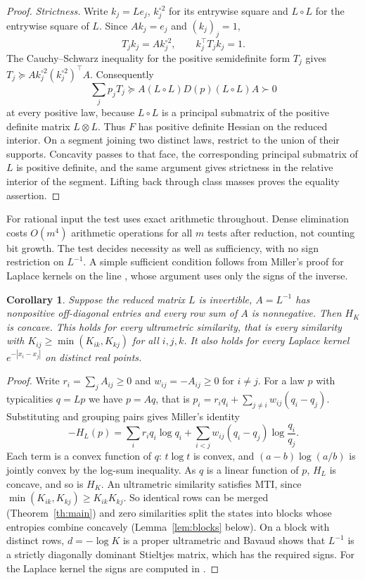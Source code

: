 \documentclass[11pt,a4paper]{article}
\newtheorem{corollary}[theorem]{Corollary}
\theoremstyle{remark}
\begin{document}
\begin{proof}
\emph{Strictness.} Write $k_j=Le_j$, $k_j^{\circ 2}$ for its entrywise square and $L\circ L$ for the entrywise square of $L$. Since $Ak_j=e_j$ and $(k_j)_j=1$,
\[
 T_j k_j=A k_j^{\circ 2},\qquad k_j^\top T_j k_j=1.
\]
The Cauchy--Schwarz inequality for the positive semidefinite form $T_j$ gives $T_j\succeq A k_j^{\circ 2}(k_j^{\circ 2})^\top A$. Consequently
\[
 \sum_j p_jT_j\succeq A(L\circ L)D(p)(L\circ L)A\succ0
\]
at every positive law, because $L\circ L$ is a principal submatrix of the positive definite matrix $L\otimes L$. Thus $F$ has positive definite Hessian on the reduced interior. On a segment joining two distinct laws, restrict to the union of their supports. Concavity passes to that face, the corresponding principal submatrix of $L$ is positive definite, and the same argument gives strictness in the relative interior of the segment. Lifting back through class masses proves the equality assertion.
\end{proof}

For rational input the test uses exact arithmetic throughout. Dense elimination costs $O(m^4)$ arithmetic operations for all $m$ tests after reduction, not counting bit growth. The test decides necessity as well as sufficiency, with no sign restriction on $L^{-1}$. A simple sufficient condition follows from Miller's proof for Laplace kernels on the line \cite[Appendix B.1]{miller}, whose argument uses only the signs of the inverse.

\begin{corollary}\label{cor:sign}
Suppose the reduced matrix $L$ is invertible, $A=L^{-1}$ has nonpositive off-diagonal entries and every row sum of $A$ is nonnegative. Then $H_K$ is concave. This holds for every ultrametric similarity, that is every similarity with $K_{ij}\ge\min(K_{ik},K_{kj})$ for all $i,j,k$. It also holds for every Laplace kernel $e^{-|x_i-x_j|}$ on distinct real points.
\end{corollary}
\begin{proof}
Write $r_i=\sum_jA_{ij}\ge0$ and $w_{ij}=-A_{ij}\ge0$ for $i\ne j$. For a law $p$ with typicalities $q=Lp$ we have $p=Aq$, that is $p_i=r_iq_i+\sum_{j\ne i}w_{ij}(q_i-q_j)$. Substituting and grouping pairs gives Miller's identity \cite[Appendix B.1]{miller}
\[
 -H_L(p)=\sum_ir_iq_i\log q_i+\sum_{i<j}w_{ij}(q_i-q_j)\log\frac{q_i}{q_j}.
\]
Each term is a convex function of $q$: $t\log t$ is convex, and $(a-b)\log(a/b)$ is jointly convex by the log-sum inequality. As $q$ is a linear function of $p$, $H_L$ is concave, and so is $H_K$. An ultrametric similarity satisfies MTI, since $\min(K_{ik},K_{kj})\ge K_{ik}K_{kj}$. So identical rows can be merged (Theorem~\ref{th:main}) and zero similarities split the states into blocks whose entropies combine concavely (Lemma~\ref{lem:blocks} below). On a block with distinct rows, $d=-\log K$ is a proper ultrametric and Bavaud \cite[Theorem 6c]{bavaud} shows that $L^{-1}$ is a strictly diagonally dominant Stieltjes matrix, which has the required signs. For the Laplace kernel the signs are computed in \cite[Appendix B.1]{miller}.
\end{proof}
\end{document}

